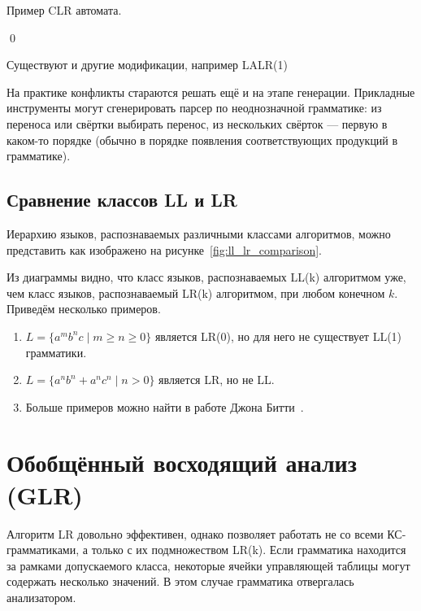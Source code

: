 \begin{example}
Пример CLR автомата.

\begin{center}
  
\end{center}
\qed
\end{example}


Существуют и другие модификации, например LALR(1)

На практике конфликты стараются решать ещё и на этапе генерации.
Прикладные инструменты могут сгенерировать парсер по неоднозначной грамматике: из переноса или свёртки выбирать перенос, из нескольких свёрток --- первую в каком-то порядке (обычно в порядке появления соответствующих продукций в грамматике).

\subsection{Сравнение классов LL и LR}

Иерархию языков, распознаваемых различными классами алгоритмов, можно представить как изображено на рисунке~\ref{fig:ll_lr_comparison}.

\begin{marginfigure}
\begin{center}
  
\end{center}
\caption{Соотношение между классами $LL(k)$ и $LR(k)$}
\label{fig:ll_lr_comparison}
\end{marginfigure}

Из диаграммы видно, что класс языков, распознаваемых LL(k) алгоритмом уже, чем класс языков, распознаваемый LR(k) алгоритмом, при любом конечном $k$. Приведём несколько примеров.
\begin{enumerate}
\item $L = \{a^mb^nc \mid m \geq n \geq 0\} $ является LR(0), но для него не существует LL(1) грамматики.
\item $L = \{ a^n b^n + a^n c^n \mid n > 0\}$ является LR, но не LL.
\item Больше примеров можно найти в работе Джона Битти~\cite{BEATTY1980193}.
\end{enumerate}

\section{Обобщённый восходящий анализ (GLR)}

Алгоритм LR довольно эффективен, однако позволяет работать не со всеми КС-грамматиками, а только с их подмножеством LR(k). Если грамматика находится за рамками допускаемого класса, некоторые ячейки управляющей таблицы могут содержать несколько значений. В этом случае грамматика отвергалась анализатором.

